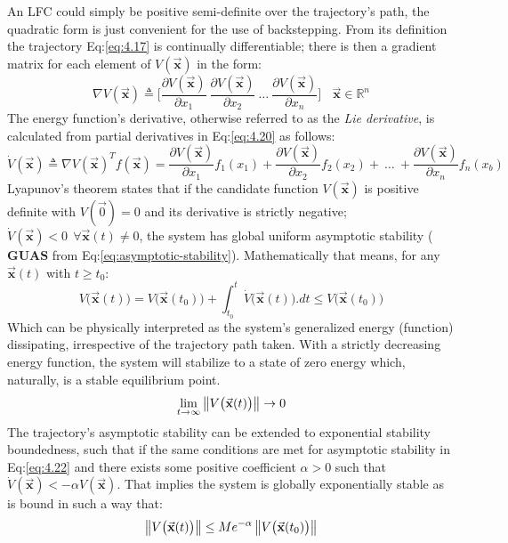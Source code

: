 An LFC could simply be positive semi-definite over the trajectory's path, the quadratic form is just convenient for the use of backstepping. From its definition the trajectory Eq:\ref{eq:4.17} is continually differentiable; there is then a gradient matrix for each element of $V(\vec{\mathbf{x}})$ in the form:
\begin{equation}\label{eq:4.20}
\nabla V(\vec{\mathbf{x}})\triangleq\bigg[\frac{\partial V(\vec{\mathbf{x}})}{\partial x_1}~\frac{\partial V(\vec{\mathbf{x}})}{\partial x_2}~\ldots~\frac{\partial V(\vec{\mathbf{x}})}{\partial x_n}\bigg]~~~~\vec{\mathbf{x}}\in\mathbb{R}^n
\end{equation}
The energy function's derivative, otherwise referred to as the \emph{Lie derivative}, is calculated from partial derivatives in Eq:\ref{eq:4.20} as follows:
\begin{equation}\label{eq:lyapunov-derivative}
\dot{V}(\vec{\mathbf{x}})\triangleq\nabla V(\vec{\mathbf{x}})^Tf(\vec{\mathbf{x}})=\frac{\partial V(\vec{\mathbf{x}})}{\partial x_1}f_1(x_1)+\frac{\partial V(\vec{\mathbf{x}})}{\partial x_2}f_2(x_2)+~\ldots~+\frac{\partial V(\vec{\mathbf{x}})}{\partial x_n}f_n(x_b)
\end{equation}
Lyapunov's theorem states that if the candidate function $V(\vec{\mathbf{x}})$ is positive definite with $V(\vec{0})=0$ and its derivative is strictly negative; $\dot{V}(\vec{\mathbf{x}})< 0~~\forall \vec{\mathbf{x}}(t) \not= 0$, the system has global uniform asymptotic stability ($\mathbf{GUAS}$ from Eq:\ref{eq:asymptotic-stability}). Mathematically that means, for any $\vec{\mathbf{x}}(t)$ with $t\geq t_0$:
\begin{equation}\label{eq:4.22}
V\big(\vec{\mathbf{x}}(t)\big)=V\big(\vec{\mathbf{x}}(t_0)\big)+\int_{t_0}^t \dot{V}\big(\vec{\mathbf{x}}(t)\big).dt \leq V\big(\vec{\mathbf{x}}(t_0)\big)
\end{equation}
Which can be physically interpreted as the system's generalized energy (function) dissipating, irrespective of the trajectory path taken. With a strictly decreasing energy function, the system will stabilize to a state of zero energy which, naturally, is a stable equilibrium point.
\begin{equation}
\lim_{t\rightarrow\infty}\left\lVert V\big(\vec{\mathbf{x}}(t)\big)\right\rVert\rightarrow 0
\end{equation}
The trajectory's asymptotic stability can be extended to exponential stability boundedness, such that if the same conditions are met for asymptotic stability in Eq:\ref{eq:4.22} and there exists some positive coefficient $\alpha>0$ such that $\dot{V}(\vec{\mathbf{x}})<-\alpha V(\vec{\mathbf{x}})$. That implies the system is globally exponentially stable as is bound in such a way that:
\begin{equation}\label{eq:lyapunov-exponential-stability}
\left\lVert V\big(\vec{\mathbf{x}}(t)\big)\right\rVert\leq Me^{-\alpha}\left\lVert V\big(\vec{\mathbf{x}}(t_0)\big)\right\rVert
\end{equation}
